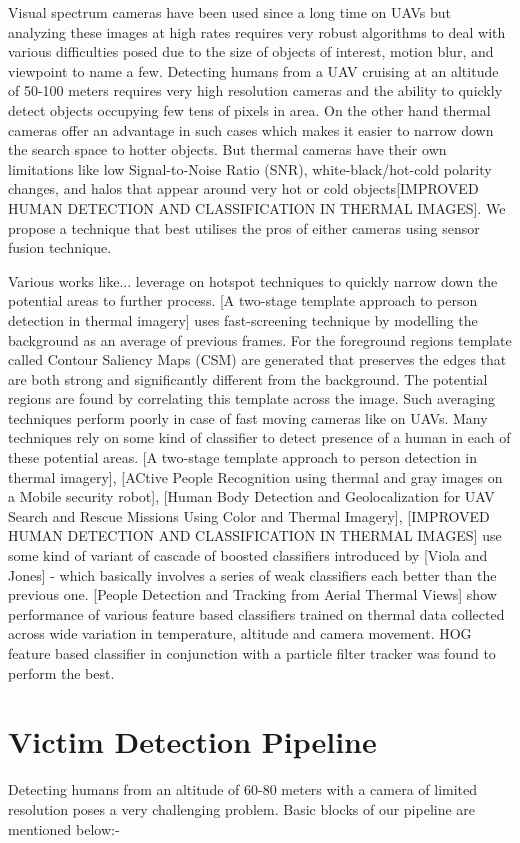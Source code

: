 \documentclass[runningheads]{llncs}
\begin{document}
Visual spectrum cameras have been used since a long time on UAVs but analyzing these images at high rates requires very robust algorithms to deal with various difficulties posed due to the size of objects of interest, motion blur, and viewpoint to name a few. Detecting humans from a UAV cruising at an altitude of 50-100 meters requires very high resolution cameras and the ability to quickly detect objects occupying few tens of pixels in area. On the other hand thermal cameras offer an advantage in such cases which makes it easier to narrow down the search space to hotter objects. But thermal cameras have their own limitations like low Signal-to-Noise Ratio (SNR), white-black/hot-cold polarity changes, and halos that appear around very hot or cold objects[IMPROVED HUMAN DETECTION AND CLASSIFICATION IN THERMAL IMAGES]. We propose a technique that best utilises the pros of either cameras using sensor fusion technique.

Various works like... leverage on hotspot techniques to quickly narrow down the potential areas to further process. [A two-stage template approach to person detection in thermal imagery] uses fast-screening technique by modelling the background as an average of previous frames. For the foreground regions template called Contour Saliency Maps (CSM) are generated that preserves the edges that are both strong and significantly different from the background. The potential regions are found by correlating this template across the image. Such averaging techniques perform poorly in case of fast moving cameras like on UAVs. Many techniques rely on some kind of classifier to detect presence of a human in each of these potential areas. [A two-stage template approach to person detection in thermal imagery], [ACtive People Recognition using thermal and gray images on a Mobile security robot], [Human Body Detection and Geolocalization for UAV Search and Rescue Missions Using Color and Thermal Imagery], [IMPROVED HUMAN DETECTION AND CLASSIFICATION IN THERMAL IMAGES] use some kind of variant of cascade of boosted classifiers introduced by [Viola and Jones] - which basically involves a series of weak classifiers each better than the previous one. [People Detection and Tracking from Aerial Thermal Views] show performance of various feature based classifiers trained on thermal data collected across wide variation in temperature, altitude and camera movement. HOG feature based classifier in conjunction with a particle filter tracker was found to perform the best.

\section{Victim Detection Pipeline}
Detecting humans from an altitude of 60-80 meters with a camera of limited resolution poses a very challenging problem. Basic blocks of our pipeline are mentioned below:-
\end{document}
